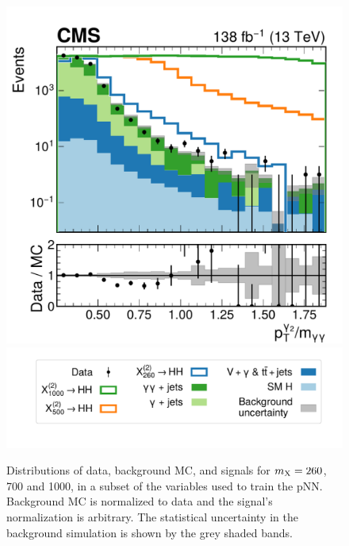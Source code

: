 \begin{figure}
    \includegraphics[width=.49\linewidth]{Figures/Dihiggs/categorisation/input_features/Graviton/Scale_equal/SubleadPhoton_pt_mgg_GluGluToBulkGravitonToHHTo2G2Tau_M-1000_log.pdf} \\
    \includegraphics[width=.7\linewidth]{Figures/Dihiggs/categorisation/input_features/Graviton/Scale_equal/legend.pdf}
    \caption[Distributions of Training Features (1)]{Distributions of data, background MC, and \XTwoHH signals for $m_{\mathrm{X}}=260$, 700 and 1000\GeV, in a subset of the variables used to train the pNN. Background MC is normalized to data and the signal's normalization is arbitrary. The statistical uncertainty in the background simulation is shown by the grey shaded bands.}\label{fig:training_features_1}
\end{figure}


